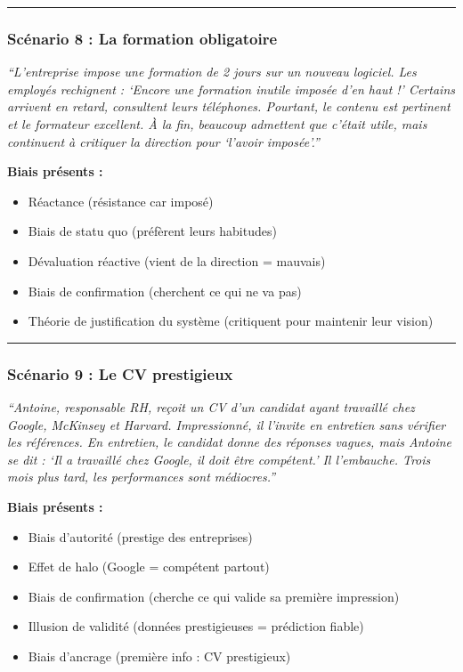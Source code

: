 \documentclass[
]{article}
\providecommand{\tightlist}{%
  \setlength{\itemsep}{0pt}\setlength{\parskip}{0pt}}
\begin{document}
\begin{center}\rule{0.5\linewidth}{0.5pt}\end{center}

\subsubsection{Scénario 8 : La formation
obligatoire}\label{scuxe9nario-8-la-formation-obligatoire}

\emph{``L'entreprise impose une formation de 2 jours sur un nouveau
logiciel. Les employés rechignent : `Encore une formation inutile
imposée d'en haut !' Certains arrivent en retard, consultent leurs
téléphones. Pourtant, le contenu est pertinent et le formateur
excellent. À la fin, beaucoup admettent que c'était utile, mais
continuent à critiquer la direction pour `l'avoir imposée'.''}

\textbf{Biais présents :}

\begin{itemize}
\tightlist
\item
  Réactance (résistance car imposé)
\item
  Biais de statu quo (préfèrent leurs habitudes)
\item
  Dévaluation réactive (vient de la direction = mauvais)
\item
  Biais de confirmation (cherchent ce qui ne va pas)
\item
  Théorie de justification du système (critiquent pour maintenir leur
  vision)
\end{itemize}

\begin{center}\rule{0.5\linewidth}{0.5pt}\end{center}

\subsubsection{Scénario 9 : Le CV
prestigieux}\label{scuxe9nario-9-le-cv-prestigieux}

\emph{``Antoine, responsable RH, reçoit un CV d'un candidat ayant
travaillé chez Google, McKinsey et Harvard. Impressionné, il l'invite en
entretien sans vérifier les références. En entretien, le candidat donne
des réponses vagues, mais Antoine se dit : `Il a travaillé chez Google,
il doit être compétent.' Il l'embauche. Trois mois plus tard, les
performances sont médiocres.''}

\textbf{Biais présents :}

\begin{itemize}
\tightlist
\item
  Biais d'autorité (prestige des entreprises)
\item
  Effet de halo (Google = compétent partout)
\item
  Biais de confirmation (cherche ce qui valide sa première impression)
\item
  Illusion de validité (données prestigieuses = prédiction fiable)
\item
  Biais d'ancrage (première info : CV prestigieux)
\end{itemize}
\end{document}
